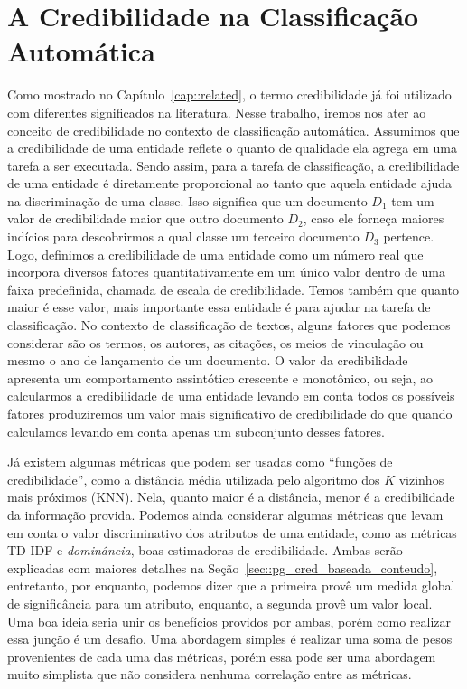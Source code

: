 \chapter{A Credibilidade na Classificação Automática} 
\label{cap::metodo}

Como mostrado no Capítulo~\ref{cap::related}, o termo credibilidade já foi utilizado com diferentes significados na literatura. Nesse trabalho, iremos nos ater ao conceito de credibilidade no contexto de classificação automática. Assumimos que a credibilidade de uma entidade reflete o quanto de qualidade ela agrega em uma tarefa a ser executada. Sendo assim, para a tarefa de classificação, a credibilidade de uma entidade é diretamente proporcional ao tanto que aquela entidade ajuda na discriminação de uma classe. Isso significa que um documento $D_{1}$ tem um valor de credibilidade maior que outro documento $D_{2}$, caso ele forneça maiores indícios para descobrirmos a qual classe um terceiro documento $D_{3}$ pertence. Logo, definimos a credibilidade de uma entidade como um número real que incorpora diversos fatores quantitativamente em um único valor dentro de uma faixa predefinida, chamada de escala de credibilidade. Temos também que quanto maior é esse valor, mais importante essa entidade é para ajudar na tarefa de classificação. No contexto de classificação de textos, alguns fatores que podemos considerar são os termos, os autores, as citações, os meios de vinculação ou mesmo o ano de lançamento de um documento. O valor da credibilidade apresenta um comportamento assintótico crescente e monotônico, ou seja, ao calcularmos a credibilidade de uma entidade levando em conta todos os possíveis fatores produziremos um valor mais significativo de credibilidade do que quando calculamos levando em conta apenas um subconjunto desses fatores.

Já existem algumas métricas que podem ser usadas como ``funções de credibilidade'', como a distância média utilizada pelo algoritmo dos $K$ vizinhos mais próximos (\textsc{KNN}). Nela, quanto maior é a distância, menor é a credibilidade da informação provida. Podemos ainda considerar algumas métricas que levam em conta o valor discriminativo dos atributos de uma entidade, como as métricas \textsc{TD-IDF} e \textit{dominância}, boas estimadoras de credibilidade. Ambas serão explicadas com maiores detalhes na Seção~\ref{sec::pg_cred_baseada_conteudo}, entretanto, por enquanto, podemos dizer que a primeira provê um medida global de significância para um atributo, enquanto, a segunda provê um valor local. Uma boa ideia seria unir os benefícios providos por ambas, porém como realizar essa junção é um desafio. Uma abordagem simples é realizar uma soma de pesos provenientes de cada uma das métricas, porém essa pode ser uma abordagem muito simplista que não considera nenhuma correlação entre as métricas.

